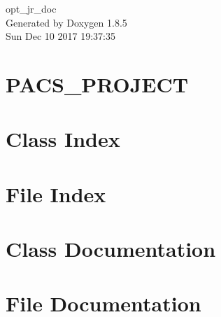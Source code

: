 \documentclass[twoside]{book}
\newcommand{\clearemptydoublepage}{%
  \newpage{\pagestyle{empty}\cleardoublepage}%
}
\begin{document}
\hypersetup{pageanchor=false}
\begin{titlepage}
\vspace*{7cm}
\begin{center}%
{\Large opt\-\_\-jr\-\_\-doc }\\
\vspace*{1cm}
{\large Generated by Doxygen 1.8.5}\\
\vspace*{0.5cm}
{\small Sun Dec 10 2017 19:37:35}\\
\end{center}
\end{titlepage}
\clearemptydoublepage
\tableofcontents
\clearemptydoublepage
{}
\hypersetup{pageanchor=true}

\chapter{P\-A\-C\-S\-\_\-\-P\-R\-O\-J\-E\-C\-T}
\label{md__vagrant_PROJECT_SPARK_PACS_PROJECT_README}
\hypertarget{md__vagrant_PROJECT_SPARK_PACS_PROJECT_README}{}

\chapter{Class Index}

\chapter{File Index}

\chapter{Class Documentation}









\chapter{File Documentation}



































\newpage
{}
{}
\printindex
\end{document}
